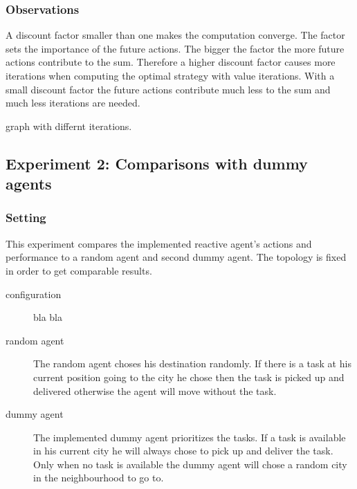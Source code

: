 \documentclass[11pt]{article}
\begin{document}
\subsubsection{Observations}
A discount factor smaller than one makes the computation converge. The factor sets the importance of the future actions. The bigger the factor the more future actions contribute to the sum. Therefore a higher discount factor causes more iterations when computing the optimal strategy with value iterations. With a small discount factor the future actions contribute much less to the sum and much less iterations are needed.  

graph with differnt iterations.



\subsection{Experiment 2: Comparisons with dummy agents}



\subsubsection{Setting}
This experiment compares the implemented reactive agent's actions and performance to a random agent and second dummy agent. The topology is fixed in  order to get comparable results. 
\begin{description}
\item[configuration]bla bla
\item[random agent]
The random agent choses his destination randomly. If there is a task at his current position going to the city he chose then the task is picked up and delivered otherwise the agent will move without the task.
\item [dummy agent]
The implemented dummy agent prioritizes the tasks. If a task is available in his current city he will always chose to pick up and deliver the task. Only when no task is available the dummy agent will chose a random city in the neighbourhood to go to. 


\end{description}
\end{document}
